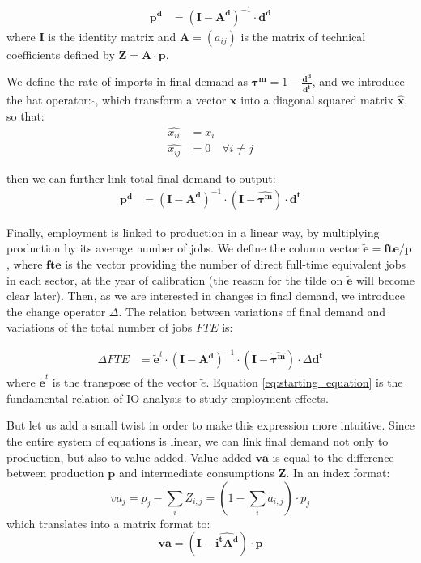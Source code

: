 \begin{align*}
	\pmb{p^d} &= (\pmb{I} - \pmb{A^d})^{-1} \cdot \pmb{d^d}	
\end{align*}
where $\pmb{I}$ is the identity matrix and $\pmb{A}= (a_{ij})$ is the matrix of technical coefficients defined by $\pmb{Z} = \pmb{A} \cdot \pmb{p}$.

We define the rate of imports in final demand as $\pmb{\tau^m} = 1- \frac{\pmb{d^d}}{\pmb{d^t}}$, and we introduce the hat operator: $\widehat{  }$, which transform a vector $\pmb{x}$ into a diagonal squared matrix $\pmb{\hat{x}}$, so that:
\begin{align*}
	\widehat{x_{ii}} &=x_i \\
	\widehat{x_{ij}} &=0 \quad \forall i \ne j
\end{align*}

then we can further link total final demand to output:
\begin{align*}	
	\pmb{p^d} &= (\pmb{I} - \pmb{A^d})^{-1} \cdot (\pmb{I} - \pmb{\widehat{\tau^m}}) \cdot \pmb{d^t}	
\end{align*}

Finally, employment is linked to production in a linear way, by multiplying production by its average number of jobs. We define the column vector $\pmb{\tilde{e}} = \pmb{fte}/\pmb{p}$, where $\pmb{fte}$ is the vector providing the number of direct full-time equivalent jobs in each sector, at the year of calibration (the reason for the tilde on $\pmb{\tilde{e}}$ will become clear later). 
Then, as we are interested in changes in final demand, we introduce the change operator $\Delta$. 
The relation between variations of final demand and variations of the total number of jobs $FTE$ is:

\begin{align}	
	\Delta FTE &=  \pmb{\tilde{e}}^t \cdot (\pmb{I} - \pmb{A^d})^{-1} \cdot (\pmb{I} - \pmb{\widehat{\tau^m}})\cdot \Delta \pmb{d^t}
	\label{eq:starting_equation}
\end{align}
where $\pmb{\tilde{e}}^t$ is the transpose of the vector $\tilde{e}$. Equation \ref{eq:starting_equation} is the fundamental relation of IO analysis to study employment effects. 

But let us add a small twist in order to make this expression more intuitive. 
Since the entire system of equations is linear, we can link final demand not only to production, but also to value added.
Value added $\pmb{va}$ is equal to the difference between production $\pmb{p}$ and intermediate consumptions $\pmb{Z}$. 
In an index format:
$$va_j = p_j - \sum_i Z_{i,j} =  (1 - \sum_i a_{i,j}) \cdot p_j$$
which translates into a matrix format to:
$$\pmb{va} = (\pmb{I} - \widehat{\pmb{i^t A^d}}) \cdot \pmb{p}$$

